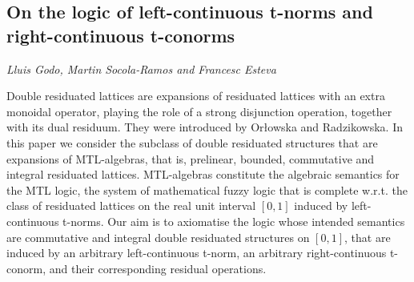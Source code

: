 \documentclass[../booklet.tex]{subfiles}
\begin{document}
\subsection[On the logic of left-continuous t-norms and right-continuous t-conorms. {\it Lluis Godo, Martin Socola-Ramos and Francesc Esteva}]{On the logic of left-continuous t-norms and right-continuous t-conorms}
  

\begin{center}
  {\it Lluis Godo, Martin Socola-Ramos and Francesc Esteva}
\end{center}



Double residuated lattices are expansions of residuated lattices with an extra monoidal operator, playing the role of a strong disjunction operation, together with its dual residuum. They were introduced by Or{\l}owska and Radzikowska. In this paper we consider the subclass of double residuated structures that are expansions  of MTL-algebras, that is, prelinear, bounded, commutative and integral residuated lattices. MTL-algebras constitute the algebraic semantics for the MTL logic, the system of mathematical fuzzy logic that is complete w.r.t. the class of residuated lattices on the real unit interval $[0,1]$ induced by left-continuous t-norms. Our aim is to axiomatise the logic whose intended semantics are commutative and integral double residuated structures on $[0, 1]$, that are induced by an arbitrary left-continuous t-norm, an arbitrary right-continuous t-conorm, and their corresponding residual operations.
\end{document}
